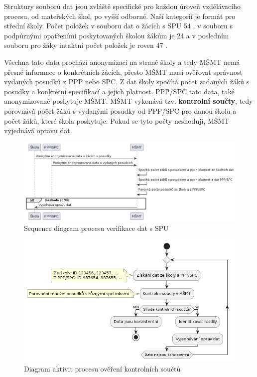 \documentclass[FM,Proj]{tulthesis}
\begin{document}
Struktury souborů dat jsou zvláště specifické pro každou úroveň vzdělávacího procesu, 
od mateřských škol, po vyšší odborné. Naší kategorií je formát pro střední školy.
Počet položek v souboru dat o žácích s SPU 54 \cite{msmt-rozhrani-predavani-dat-2023},
v souboru s podpůrnými opatřeními poskytovaných školou žákům je 24 
\cite{msmt-rozhrani-predavani-dat-2023} a v posledním souboru pro žáky intaktní počet položek
je roven 47 \cite{msmt-rozhrani-predavani-dat-2023}.

Všechna tato data prochází anonymizací na straně školy a tedy MŠMT nemá přesné informace o konkrétních 
žácích, přesto MŠMT musí ověřovat správnost vydaných posudků z PPP nebo SPC. Z dat školy spočítá počet 
zadaných žáků s posudky a konkrétní specifikací a jejich platnost. PPP/SPC tato data, také anonymizovaně 
poskytuje MŠMT. MŠMT vykonává tzv. \textbf{kontrolní součty}, tedy porovnává počet žáků s vydanými posudky
od PPP/SPC pro danou školu a počet žáků, které škola poskytuje. Pokud se tyto počty neshodují, MŠMT
vyjednává opravu dat.

\begin{figure}[H]
    \includegraphics[width=\textwidth-28pt]{seq-kontrolni-soucty.png}
    \caption{Sequence diagram procesu verifikace dat s SPU}
    \label{fig:seq-kontrolni-soucty}
\end{figure}

\begin{figure}[H]
    \includegraphics[width=\textwidth-28pt]{act-proces-kontrolnich-souctu.png}
    \caption{Diagram aktivit procesu ověření kontrolních součtů}
    \label{fig:act-proces-kontrolnich-souctu}
\end{figure}
\end{document}
